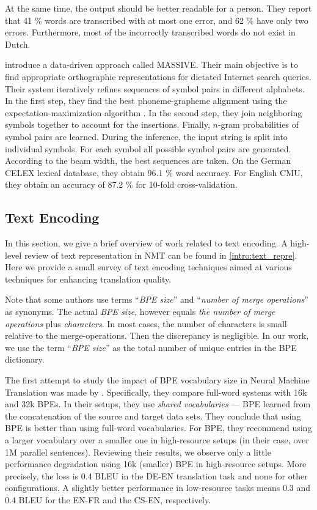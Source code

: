 At the same time, the output should be better readable for a person. They report that 41 \% words are transcribed with at most one error, and 62 \% have only two errors. Furthermore, most of the incorrectly transcribed words do not exist in Dutch.

 introduce a data-driven approach called MASSIVE. Their main objective is to find appropriate orthographic representations for dictated Internet search queries. Their system iteratively refines sequences of symbol pairs in different alphabets. In the first step, they find the best phoneme-grapheme alignment using the expectation-maximization algorithm . In the second step, they join neighboring symbols together to account for the insertions. Finally, $n$-gram probabilities of symbol pairs are learned. During the inference, the input string is split into individual symbols. For each symbol all possible symbol pairs are generated. According to the beam width, the best sequences are taken. On the German CELEX lexical database, they obtain 96.1 \% word accuracy. For English CMU, they obtain an accuracy of 87.2 \% for 10-fold cross-validation.

\subsection{Text Encoding}
\label{easr:re_encoding}
In this section, we give a brief overview of work related to text encoding. A high-level review of text representation in NMT can be found in \cref{intro:text_repre}. Here we provide a small survey of text encoding techniques aimed at various techniques for enhancing translation quality. 

Note that some authors use terms ``\textit{BPE size}'' and ``\textit{number of merge operations}'' as synonyms. The actual \textit{BPE size}, however equals \textit{the number of merge operations} plus \textit{characters}. In most cases, the number of characters is small relative to the merge-operations. Then the discrepancy is negligible. In our work, we use the term ``\textit{BPE size}'' as the total number of unique entries in the BPE dictionary.

The first attempt to study the impact of BPE vocabulary size in Neural Machine Translation was made by . Specifically, they compare full-word systems with 16k and 32k BPEs. In their setups, they use \textit{shared vocabularies} --- BPE learned from the concatenation of the source and target data sets. They conclude that using BPE is better than using full-word vocabularies. For BPE, they recommend using a larger vocabulary over a smaller one in high-resource setups (in their case, over 1M parallel sentences). Reviewing their results, we observe only a little performance degradation using 16k (smaller) BPE in high-resource setups. More precisely, the loss is 0.4 BLEU in the DE-EN translation task and none for other configurations. A slightly better performance in low-resource tasks means 0.3 and 0.4 BLEU for the EN-FR and the CS-EN, respectively.

